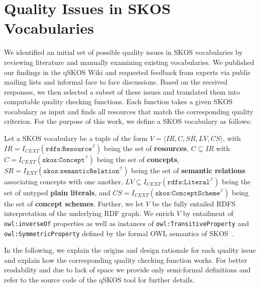 
\section{Quality Issues in SKOS Vocabularies}\label{sec:criteria}


We identified an initial set of possible quality issues in SKOS vocabularies by reviewing literature and manually examining existing vocabularies. We published our findings in the qSKOS Wiki and requested feedback from experts via public mailing lists and informal face to face discussions. Based on the received responses, we then selected a subset of these issues and translated them into computable quality checking functions. Each function takes a given SKOS vocabulary as input and finds all resources that match the corresponding quality criterion. For the purpose of this work, we define a SKOS vocabulary as follows:

\begin{mydef}
Let a SKOS vocabulary be a tuple of the form $V = \langle IR, C, SR, LV, CS \rangle$, with \(IR = I_{CEXT}(\texttt{rdfs:Resource}^\mathcal{I})\) being the set of \textbf{resources}, \(C \subseteq IR\) with \(C = I_{CEXT}(\texttt{skos:Concept}^\mathcal{I})\) being the set of \textbf{concepts}, \(SR = I_{EXT}(\texttt{skos:semanticRelation}^\mathcal{I})\) being the set of \textbf{semantic relations} associating concepts with one another, $LV \subseteq I_{CEXT}(\texttt{rdfs:Literal}^\mathcal{I})$ being the set of untyped \textbf{plain literals}, and \(CS = I_{CEXT}(\texttt{skos:ConceptScheme}^\mathcal{I})\) being the set of \textbf{concept schemes}. Further, we let $V$ be the fully entailed RDFS interpretation of the underlying RDF graph. We enrich $V$ by entailment of \texttt{owl:inverseOf} properties as well as instances of \texttt{owl:TransitiveProperty} and \texttt{owl:SymmetricProperty} defined by the formal OWL semantics of SKOS~\cite{SkosReference2008}.
\end{mydef}

In the following, we explain the origins and design rationale for each quality issue and explain how the corresponding quality checking function works. For better readability and due to lack of space we provide only semi-formal definitions and refer to the source code of the qSKOS tool for further details.

